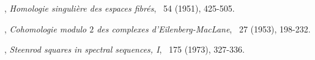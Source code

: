 \begin{thebibliography}{99}









, \textit{Homologie singuli\`ere des espaces fibr\' es}, \ANNMAone\ 54 (1951), 425-505.

, \textit{Cohomologie modulo $2$ des complexes d'Eilenberg-MacLane}, \COMMH\ 27 (1953), 198-232.

, \textit{Steenrod squares in spectral sequences, I}, \TRAAM\ 175 (1973), 327-336.




\end{thebibliography}
